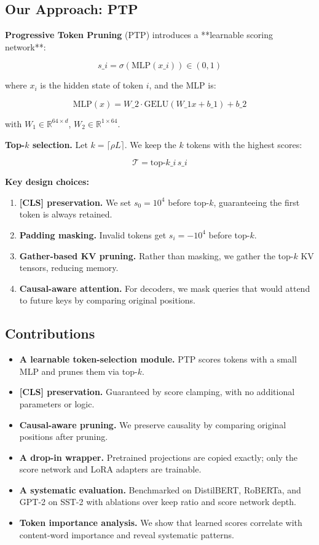 \subsection{Our Approach: PTP}

\textbf{Progressive Token Pruning} (PTP) introduces a **learnable scoring 
network**:

\[
s\_i = \sigma\left(\text{MLP}(x\_i)\right) \in (0, 1)
\tag{1.1}
\]

where $x_i$ is the hidden state of token $i$, and the MLP is:

\[
\text{MLP}(x) = W\_2 \cdot \text{GELU}(W\_1 x + b\_1) + b\_2
\tag{1.2}
\]

with $W_1 \in \mathbb{R}^{64 \times d}$, $W_2 \in \mathbb{R}^{1 \times 64}$.

\textbf{Top-$k$ selection.} Let $k = \lceil \rho L \rceil$. We keep the $k$ 
tokens with the highest scores:

\[
\mathcal{T} = \text{top-}k\_i \, s\_i
\tag{1.3}
\]

\textbf{Key design choices:}

\begin{enumerate}
\item \textbf{[CLS] preservation.} We set $s_0 = 10^4$ before top-$k$, guaranteeing
  the first token is always retained.
\item \textbf{Padding masking.} Invalid tokens get $s_i = -10^4$ before top-$k$.
\item \textbf{Gather-based KV pruning.} Rather than masking, we gather the top-$k$
  KV tensors, reducing memory.
\item \textbf{Causal-aware attention.} For decoders, we mask queries that would
  attend to future keys by comparing original positions.

\end{enumerate}
\subsection{Contributions}

\begin{itemize}
\item \textbf{A learnable token-selection module.} PTP scores tokens with a small
  MLP and prunes them via top-$k$.
\item \textbf{[CLS] preservation.} Guaranteed by score clamping, with no additional
  parameters or logic.
\item \textbf{Causal-aware pruning.} We preserve causality by comparing original
  positions after pruning.
\item \textbf{A drop-in wrapper.} Pretrained projections are copied exactly; only
  the score network and LoRA adapters are trainable.
\item \textbf{A systematic evaluation.} Benchmarked on DistilBERT, RoBERTa, and
  GPT-2 on SST-2 with ablations over keep ratio and score network depth.
\item \textbf{Token importance analysis.} We show that learned scores correlate with
  content-word importance and reveal systematic patterns.

\end{itemize}
